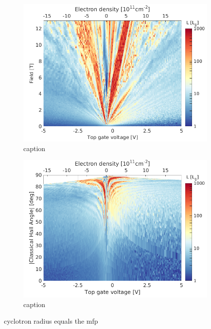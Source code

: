 \begin{figure}
\centering
\includegraphics[width=100mm]{figures/magneto/Fan_L.png}
\caption{caption}
\label{fig:m_L}
\end{figure}

\begin{figure}
\centering
\includegraphics[width=100mm]{figures/magneto/L_n_Ha.png}
\caption{caption}
\label{fig:m_L_n_Ha}
\end{figure}

cyclotron radius equals the mfp